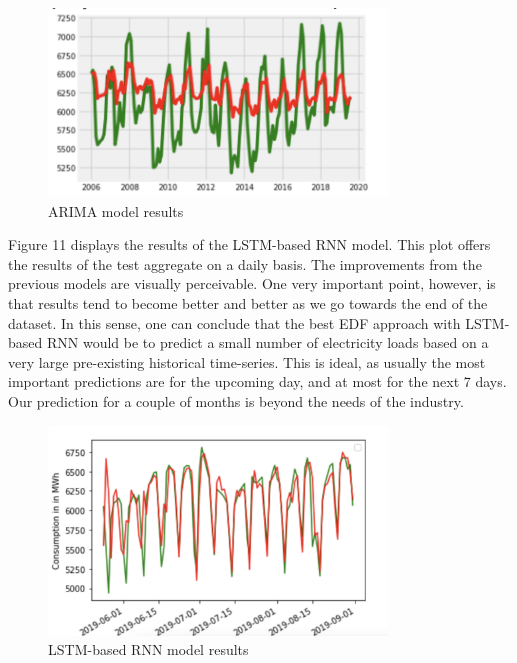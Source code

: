 \documentclass[10pt,twocolumn,letterpaper]{article}
\begin{document}
\begin{figure}[H]
\begin{center}
   \includegraphics[width=9cm]{final-report-latex/ARIMA_Figure.png}
   \caption{ARIMA model results}
   \end{center}
\end{figure}

Figure 11 displays the results of the LSTM-based RNN model. This plot offers the results of the test aggregate on a daily basis. The improvements from the previous models are visually perceivable. One very important point, however, is that results tend to become better and better as we go towards the end of the dataset. In this sense, one can conclude that the best EDF approach with LSTM-based RNN would be to predict a small number of electricity loads based on a very large pre-existing historical time-series. This is ideal, as usually the most important predictions are for the upcoming day, and at most for the next 7 days. Our prediction for a couple of months is beyond the needs of the industry. 

\begin{figure}[H]
\begin{center}
   \includegraphics[width=9cm]{final-report-latex/LSTM_Figure.png}
   \caption{LSTM-based RNN model results}
   \end{center}
\end{figure}
\end{document}
